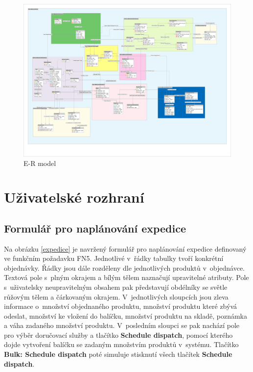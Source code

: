 \documentclass[thesis=B,czech]{FITthesis}[2012/06/26]
\begin{document}
\begin{figure}
	\includegraphics[width=500pt, height=\textwidth, angle=90]{mahasys_ermodel.png}
	\caption{E-R model}\label{er_model}
\end{figure}



\section{Uživatelské rozhraní}

\subsection{Formulář pro naplánování expedice}
	Na obrázku \ref{expedice} je navržený formulář pro naplánování expedice definovaný ve funkčním požadavku FN5. Jednotlivé v~řádky tabulky tvoří konkrétní objednávky. Řádky jsou dále rozděleny dle jednotlivých produktů v~objednávce. Textová pole s~plným okrajem a bílým tělem naznačují upravitelné atributy. Pole s~uživatelsky neupravitelným obsahem pak představují obdélníky se světle růžovým tělem a čárkovaným okrajem. V~jednotlivých sloupcích jsou zleva informace o~množství objednaného produktu, množství produktu které zbývá odeslat, množství ke vložení do balíčku, množství produktu na skladě, poznámka a váha zadaného množství produktu. V~posledním sloupci se pak nachází pole pro výběr doručovací služby a tlačítko \textbf{Schedule dispatch}, pomocí kterého dojde vytvoření balíčku se zadaným množstvím produktů v~systému. Tlačítko \textbf{Bulk: Schedule dispatch} poté simuluje stisknutí všech tlačítek \textbf{Schedule dispatch}.
\end{document}
